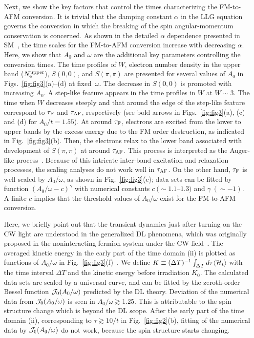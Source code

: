 \documentclass[aps,twocolumn,showpacs,prl,amsmath,amssymb]{revtex4-1}
\begin{document}
Next, we show the key factors that control the times characterizing the FM-to-AFM conversion. 
It is trivial that the damping constant $\alpha$ in the LLG equation governs the conversion in which the breaking of the spin angular-momentum conservation is concerned. 
As shown in the detailed $\alpha$ dependence presented in SM~\cite{sm}, 
the time scales for the FM-to-AFM conversion increase with decreasing $\alpha$. 
Here, we show that $A_0$ and $\omega$ are the additional key parameters controlling the conversion times. 
The time profiles of $W$, electron number density in the upper band ($N_{\rm e}^{\rm upper}$), $S(0, 0)$, and $S(\pi, \pi)$ are presented for several values of $A_0$ in Figs.~\ref{fig:fig3}(a)--(d) at fixed~$\omega$. 
The decrease in $S(0, 0)$ is promoted with increasing $A_0$. 
A step-like feature appears in the time profiles in $W$ at $W \sim 3$. 
The time when $W$ decreases steeply and that around the edge of the step-like feature correspond to $\tau_{\rm F}$ and $\tau_{\rm AF}$, respectively (see bold arrows in Figs.~\ref{fig:fig3}(a), (c) and (d) for $ A_0/t=1.55$).
At around $\tau_{\rm F}$, electrons are excited from the lower to upper bands by the excess energy due to the FM order destruction, as indicated in Fig.~\ref{fig:fig3}(b). 
Then, the electrons relax to the lower band associated with development of $S(\pi, \pi)$ at around $\tau_{\rm AF}$. 
This process is interpreted as the Auger-like process~\cite{koshibae2}. 
Because of this intricate inter-band excitation and relaxation processes, the scaling analyses do not work well in $\tau_{\rm AF}$. 
%
On the other hand, 
$\tau_{\rm F}$ is well scaled by $A_0/\omega$, as shown in Fig.~\ref{fig:fig3}(e); 
data sets can be fitted by function $(A_0/\omega-c)^{\gamma}$ with numerical constants $c \ (\sim 1.1$--$1.3)$ and $\gamma \ (\sim -1)$. 
A finite $c$ implies that the threshold values of $A_0/\omega$ exist for the FM-to-AFM conversion. 

Here, we briefly point out that the transient dynamics just after turning on the CW light are understood in the generalized DL phenomena, which was originally proposed in the noninteracting fermion system under the CW field~\cite{dunlap,grossmann,ishikawa}. 
The averaged kinetic energy in the early part of the time domain (ii) is plotted as functions of $A_0/\omega$ in Fig.~\ref{fig:fig3}(f)~\cite{DLdetail}. 
We define $K \equiv (\Delta T)^{-1}\int_{\Delta T} d \tau \langle {\cal H}_t \rangle$ with the time interval $\Delta T$ and the kinetic energy before irradiation $K_0$.
The calculated data sets are scaled by a universal curve, and can be fitted by the zeroth-order Bessel function ${\cal J}_0(A_0/\omega)$ predicted by the DL theory. 
Deviation of the numerical data from ${\cal J}_0(A_0/\omega)$ is seen in $A_0/\omega \gtrsim 1.25$. 
This is attributable to the spin structure change which is beyond the DL scope. 
After the early part of the time domain (ii), corresponding to $\tau \gtrsim 10/t $ in Fig.~\ref{fig:fig2}(b), 
fitting of the numerical data by ${\cal J}_0(A_0/\omega)$ do not work, because the spin structure starts changing. 
\end{document}

